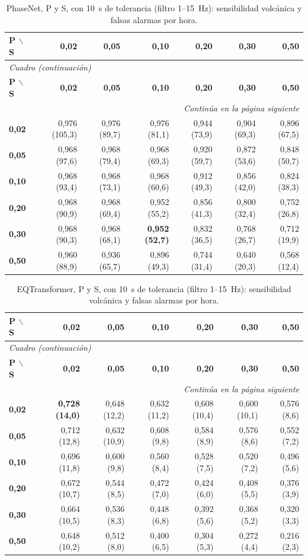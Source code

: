\documentclass[11pt,a4paper,oneside,spanish,oldfontcommands]{memoir}
\newcommand{\cabecera}[2]{%
  \toprule #1 \\ \midrule \endfirsthead
  \multicolumn{#2}{l}{\itshape Cuadro \thetable{} (continuación)}\\
  \toprule #1 \\ \midrule \endhead
  \midrule \multicolumn{#2}{r}{\itshape Continúa en la página siguiente}\\ \endfoot
  \bottomrule \endlastfoot}
\begin{document}
{\small
\setlength{\tabcolsep}{3pt}
\begin{longtable}{lrrrrrr}
\caption{PhaseNet, P y S, con 10~s de tolerancia (filtro 1--15~Hz): sensibilidad volcánica y falsas alarmas por hora.}\label{tab:ps-pn-10}\\
\cabecera{\textbf{P $\backslash$ S} & \textbf{0,02} & \textbf{0,05} & \textbf{0,10} & \textbf{0,20} & \textbf{0,30} & \textbf{0,50}}{7}
\textbf{0,02} & 0,976 (105,3) & 0,976 (89,7) & 0,976 (81,1) & 0,944 (73,9) & 0,904 (69,3) & 0,896 (67,5) \\
\textbf{0,05} & 0,968 (97,6) & 0,968 (79,4) & 0,968 (69,3) & 0,920 (59,7) & 0,872 (53,6) & 0,848 (50,7) \\
\textbf{0,10} & 0,968 (93,4) & 0,968 (73,1) & 0,968 (60,6) & 0,912 (49,3) & 0,856 (42,0) & 0,824 (38,3) \\
\textbf{0,20} & 0,968 (90,9) & 0,968 (69,4) & 0,952 (55,2) & 0,856 (41,3) & 0,800 (32,4) & 0,752 (26,8) \\
\textbf{0,30} & 0,968 (90,3) & 0,968 (68,1) & \textbf{0,952 (52,7)} & 0,832 (36,5) & 0,768 (26,7) & 0,712 (19,9) \\
\textbf{0,50} & 0,960 (88,9) & 0,936 (65,7) & 0,896 (49,3) & 0,744 (31,4) & 0,640 (20,3) & 0,568 (12,4) \\
\end{longtable}
}

{\small
\setlength{\tabcolsep}{3pt}
\begin{longtable}{lrrrrrr}
\caption{EQTransformer, P y S, con 10~s de tolerancia (filtro 1--15~Hz): sensibilidad volcánica y falsas alarmas por hora.}\label{tab:ps-eqt-10}\\
\cabecera{\textbf{P $\backslash$ S} & \textbf{0,02} & \textbf{0,05} & \textbf{0,10} & \textbf{0,20} & \textbf{0,30} & \textbf{0,50}}{7}
\textbf{0,02} & \textbf{0,728 (14,0)} & 0,648 (12,2) & 0,632 (11,2) & 0,608 (10,4) & 0,600 (10,1) & 0,576 (8,6) \\
\textbf{0,05} & 0,712 (12,8) & 0,632 (10,9) & 0,608 (9,8) & 0,584 (8,9) & 0,576 (8,6) & 0,552 (7,2) \\
\textbf{0,10} & 0,696 (11,8) & 0,600 (9,8) & 0,560 (8,4) & 0,528 (7,5) & 0,520 (7,2) & 0,496 (5,6) \\
\textbf{0,20} & 0,672 (10,7) & 0,544 (8,5) & 0,472 (7,0) & 0,424 (6,0) & 0,408 (5,5) & 0,376 (3,9) \\
\textbf{0,30} & 0,664 (10,5) & 0,536 (8,3) & 0,448 (6,8) & 0,392 (5,6) & 0,368 (5,2) & 0,320 (3,3) \\
\textbf{0,50} & 0,648 (10,2) & 0,512 (8,0) & 0,400 (6,5) & 0,304 (5,3) & 0,272 (4,4) & 0,216 (2,3) \\
\end{longtable}
}
\end{document}
